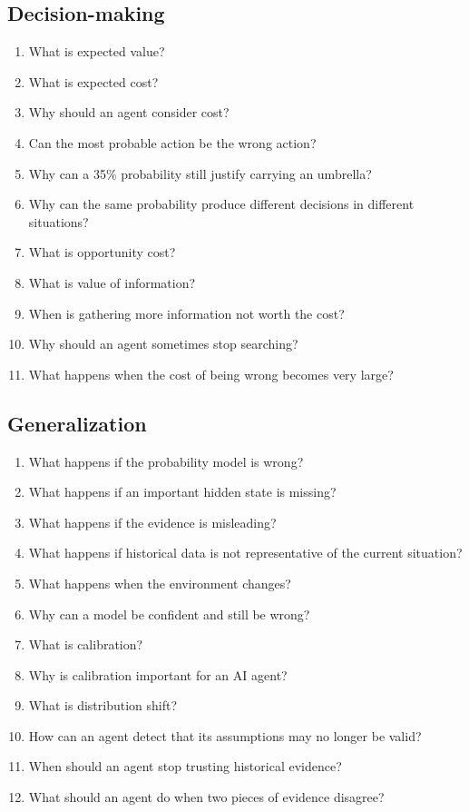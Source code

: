\documentclass[11pt,a4paper]{article}
\begin{document}
\subsection{Decision-making}
\begin{enumerate}[itemsep=1pt,start=56]
\item What is expected value?
\item What is expected cost?
\item Why should an agent consider cost?
\item Can the most probable action be the wrong action?
\item Why can a 35\% probability still justify carrying an umbrella?
\item Why can the same probability produce different decisions in different situations?
\item What is opportunity cost?
\item What is value of information?
\item When is gathering more information not worth the cost?
\item Why should an agent sometimes stop searching?
\item What happens when the cost of being wrong becomes very large?
\end{enumerate}

\subsection{Generalization}
\begin{enumerate}[itemsep=1pt,start=67]
\item What happens if the probability model is wrong?
\item What happens if an important hidden state is missing?
\item What happens if the evidence is misleading?
\item What happens if historical data is not representative of the current situation?
\item What happens when the environment changes?
\item Why can a model be confident and still be wrong?
\item What is calibration?
\item Why is calibration important for an AI agent?
\item What is distribution shift?
\item How can an agent detect that its assumptions may no longer be valid?
\item When should an agent stop trusting historical evidence?
\item What should an agent do when two pieces of evidence disagree?
\end{enumerate}
\end{document}
